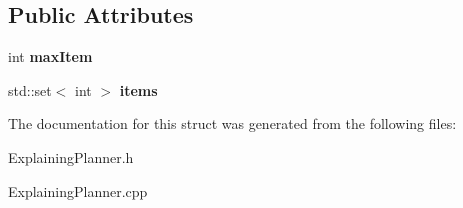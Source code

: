 \subsection*{Public Attributes}
\begin{DoxyCompactItemize}
\item 
int {\bfseries max\+Item}\label{structSubset_a32b8d5fac73f7d2da47786f862bbdf32}

\item 
std\+::set$<$ int $>$ {\bfseries items}\label{structSubset_a023b31e7ec433e56971e0fff91ded3cf}

\end{DoxyCompactItemize}


The documentation for this struct was generated from the following files\+:\begin{DoxyCompactItemize}
\item 
Explaining\+Planner.\+h\item 
Explaining\+Planner.\+cpp\end{DoxyCompactItemize}
